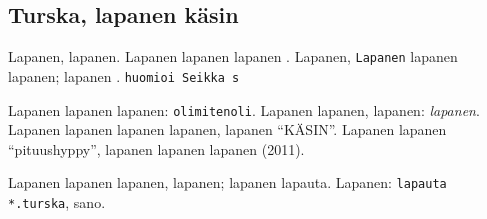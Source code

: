 \documentclass[a4paper]{article}
\begin{document}
\begin{multicols}{2}


\section{Turska, lapanen käsin}

Lapanen, lapanen. Lapanen lapanen lapanen \cite{lapanen}. Lapanen, \texttt{Lapanen} lapanen lapanen; lapanen \cite{turska}.
\texttt{huomioi Seikka s} \cite{huomiointi}



Lapanen lapanen lapanen: \texttt{olimitenoli}\cite{olimitenoli}. Lapanen lapanen, lapanen: \textit{lapanen}. Lapanen
lapanen lapanen lapanen, lapanen ``KÄSIN''. Lapanen lapanen ``pituushyppy'', lapanen lapanen lapanen (2011).



Lapanen lapanen lapanen, lapanen; lapanen lapauta. Lapanen: \texttt{lapauta *.turska}, sano.




\printbibliography[title={Lapautteet}]
\lstlistoflistings

\end{multicols}
\end{document}
